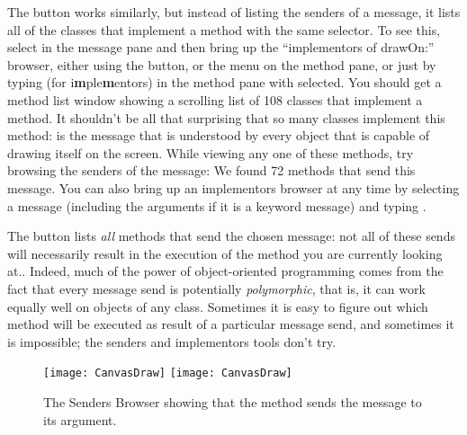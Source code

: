 \documentclass[a4paper,10pt,twoside]{book}
\begin{document}
The  button works similarly, but instead of listing the senders of a message, it lists all of the classes that implement a method with the same selector.
To see this, select  in the message pane and then bring up the ``implementors of drawOn:'' browser, either using the  button, or the  menu on the method pane, or just by typing  (for {i\textbf{m}ple\textbf{m}entors}) in the method pane with  selected.
You should get a method list window showing a scrolling list of 108 classes that implement a  method.
It shouldn't be all that surprising that so many classes implement this method:
 is the message that is understood by every object that is capable of drawing itself on the screen.
While viewing any one of these methods, try browsing the senders of the  message:
We found 72 methods that send this message.
You can also bring up an implementors browser at any time by selecting a message (including the arguments if it is a keyword message) and typing .

The  button lists \emph{all} methods that send the chosen message: not all of these sends will necessarily result in the execution of the method you are currently looking at..
Indeed, much of the power of object-oriented programming comes from the fact that every message send is potentially \emph{polymorphic}, that is, it can work equally well on objects of any class.  Sometimes it is easy to figure out which method will be executed as result of a particular message send, and sometimes it is impossible; the senders and implementors tools don't try.

\begin{figure}[htbp]
	\begin{center}
   \ifluluelse
		{\texttt{[image: CanvasDraw]}}
		{\texttt{[image: CanvasDraw]}}
	\end{center}
	\caption{The Senders Browser showing that the  method sends the  message to its argument.	\label{fig:CanvasDraw}}
\end{figure}
\end{document}
